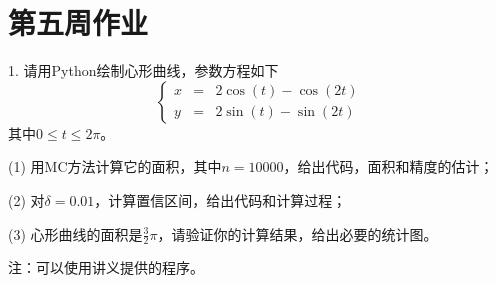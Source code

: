 \documentclass[a4paper]{ctexart}
\begin{document}
\section*{第五周作业}


1. 请用Python绘制心形曲线，参数方程如下
$$
\left\{
\begin{array}{rcl}
  x & = & 2 \cos(t) - \cos(2t) \\
  y & = & 2 \sin(t) - \sin(2t)
\end{array}
\right.
$$
其中$0 \leq t \leq 2\pi$。

(1) 用MC方法计算它的面积，其中$n = 10000$，给出代码，面积和精度的估计；

(2) 对$\delta = 0.01$，计算置信区间，给出代码和计算过程；

(3) 心形曲线的面积是$\frac{3}{2}\pi$，请验证你的计算结果，给出必要的统计图。

注：可以使用讲义提供的程序。
\end{document}
